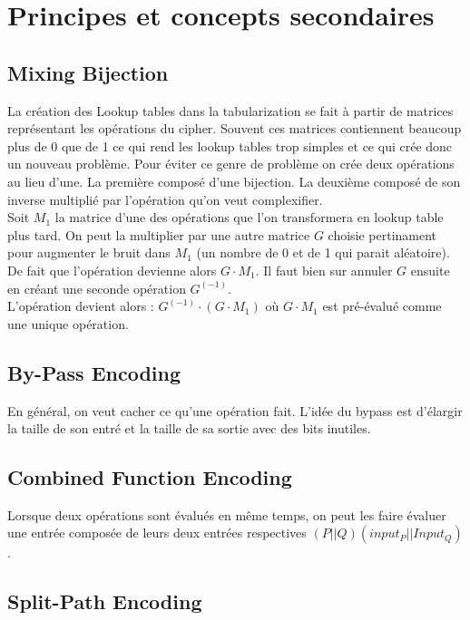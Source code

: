 \documentclass[a4paper,12pt]{article}
\begin{document}
\section{Principes et concepts secondaires}


\subsection{Mixing Bijection}

La création des Lookup tables dans la tabularization se fait à partir de matrices représentant les opérations du cipher. Souvent ces matrices contiennent beaucoup plus de 0 que de 1 ce qui rend les lookup tables trop simples et ce qui crée donc un nouveau problème. Pour éviter ce genre de problème on crée deux opérations au lieu d'une. La première composé d'une bijection. La deuxième composé de son inverse multiplié par l'opération qu'on veut complexifier.\\
Soit $M_1$ la matrice d'une des opérations que l'on transformera en lookup table plus tard. On peut la multiplier par une autre matrice $G$ choisie pertinament pour augmenter le bruit dans $M_1$ (un nombre de 0 et de 1 qui parait aléatoire). De fait que l'opération devienne alors $G \cdot M_1$. Il faut bien sur annuler $G$ ensuite en créant une seconde opération $G^(-1)$.\\
L'opération devient alors : $G^(-1) \cdot (G \cdot M_1)$ où $G \cdot M_1$ est pré-évalué comme une unique opération.

\subsection{By-Pass Encoding}

En général, on veut cacher ce qu'une opération fait. L'idée du bypass est d'élargir la taille de son entré et la taille de sa sortie avec des bits inutiles.

\subsection{Combined Function Encoding}

Lorsque deux opérations sont évalués en même temps, on peut les faire évaluer une entrée composée de leurs deux entrées respectives $(P||Q)(input_P||Input_Q)$.

\subsection{Split-Path Encoding}
\end{document}
